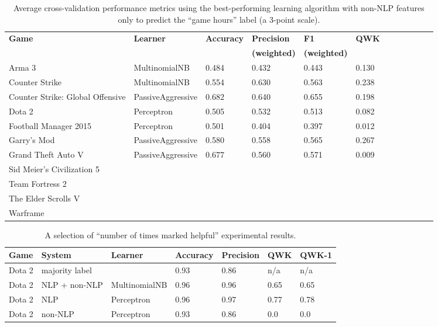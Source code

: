 \documentclass[9pt]{article}
\begin{document}
\begin{table*}[htbp]
\label{tab:gamehours_non_nlp_features}
\centering
\begin{tabular}{*{12}{l}}
\hline \bf Game & \bf Learner & \bf Accuracy & \bf Precision & \bf F1 & \bf QWK \\
& & & \bf (weighted) & \bf (weighted) & \\ \hline
Arma 3 & MultinomialNB & 0.484 & 0.432 & 0.443 & 0.130 & \\
Counter Strike & MultinomialNB & 0.554 & 0.630 & 0.563 & 0.238 \\
Counter Strike: Global Offensive & PassiveAggressive & 0.682 & 0.640 & 0.655 & 0.198 \\
Dota 2 & Perceptron & 0.505 & 0.532 & 0.513 & 0.082 \\
Football Manager 2015 & Perceptron & 0.501 & 0.404 & 0.397 & 0.012 \\
Garry's Mod & PassiveAggressive & 0.580 & 0.558 & 0.565 & 0.267 \\
Grand Theft Auto V & PassiveAggressive & 0.677 & 0.560 & 0.571 & 0.009 \\
Sid Meier's Civilization 5 & & & & & \\
Team Fortress 2 & & & & & \\
The Elder Scrolls V & & & & & \\
Warframe & & & & & \\ \hline
\end{tabular}
\caption{Average cross-validation performance metrics using the best-performing learning algorithm with non-NLP features only to predict the ``game hours'' label (a 3-point scale).}
\end{table*}

\begin{table*}[htbp]
\label{tab:helpful}
\centering
\begin{tabular}{*{7}{l}}
\hline \bf Game & \bf System & \bf Learner & \bf Accuracy & \bf Precision & \bf QWK & \bf QWK-1 \\ \hline
Dota 2 & majority label &  & 0.93 & 0.86 & n/a & n/a \\
Dota 2 & NLP + non-NLP & MultinomialNB & 0.96 & 0.96 & 0.65 & 0.65 \\
Dota 2 & NLP & Perceptron & 0.96 & 0.97 & 0.77 & 0.78 \\
Dota 2 & non-NLP & Perceptron & 0.93 & 0.86 & 0.0 & 0.0 \\ \hline
\end{tabular}
\caption{A selection of ``number of times marked helpful'' experimental results.}
\end{table*}
\end{document}
